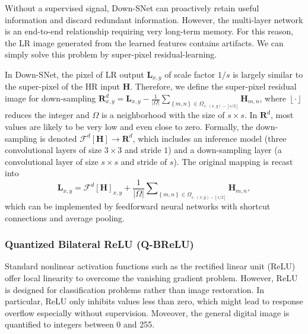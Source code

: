 \documentclass[runningheads]{llncs}
\begin{document}
Without a supervised signal, Down-SNet can proactively retain useful information and discard redundant information. However, the multi-layer network is an end-to-end relationship requiring very long-term memory. For this reason, the LR image generated from the learned features contains artifacts. We can simply solve this problem by super-pixel residual-learning.

In Down-SNet, the pixel of LR output $\textbf{L}_{x,y}$ of scale factor $1/s$ is largely similar to the super-pixel of the HR input $\textbf{H}$. Therefore, we define the super-pixel residual image for down-sampling $\textbf{R}_{x,y}^d = {\textbf{L}_{x,y}} - \frac{1}{{\left| \Omega  \right|}}\sum\nolimits_{\left\{ {m,n} \right\} \in {\Omega _{s \cdot \left( {x,y} \right) - \left\lfloor {s/2} \right\rfloor }}} {{\textbf{H}_{m,n}}}$, where $\left\lfloor{\cdot}\right\rfloor$ reduces the integer and $\Omega$ is a neighborhood with the size of $s\times s$. In $\textbf{R}^d$, most values are likely to be very low and even close to zero. Formally, the down-sampling is denoted $\mathcal{F}^d\left[\textbf{H}\right] \rightarrow \textbf{R}^d$, which includes an inference model (three convolutional layers of size $3\times 3$ and stride $1$) and a down-sampling layer (a convolutional layer of size $s\times s$ and stride of $s$). The original mapping is recast into
 \begin{equation}\label{L}
 {\textbf{L}_{x,y}} = {\mathcal{F}^d}{\left[ \textbf{H} \right]_{x,y}} + \frac{1}{{\left| \Omega  \right|}}\sum\nolimits_{\left\{ {m,n} \right\} \in {\Omega _{s \cdot \left( {x,y} \right) - \left\lfloor {s/2} \right\rfloor }}} {{\textbf{H}_{m,n}}},
 \end{equation}
which can be implemented by feedforward neural networks with shortcut connections \cite{resnet} and average pooling.

\subsubsection{Quantized Bilateral ReLU (Q-BReLU)}
Standard nonlinear activation functions such as the rectified linear unit (ReLU) offer local linearity to overcome the vanishing gradient problem. However, ReLU is designed for classification problems rather than image restoration. In particular, ReLU only inhibits values less than zero, which might lead to response overflow especially without supervision. Moveover, the general digital image is quantified to integers between 0 and 255.
\end{document}
